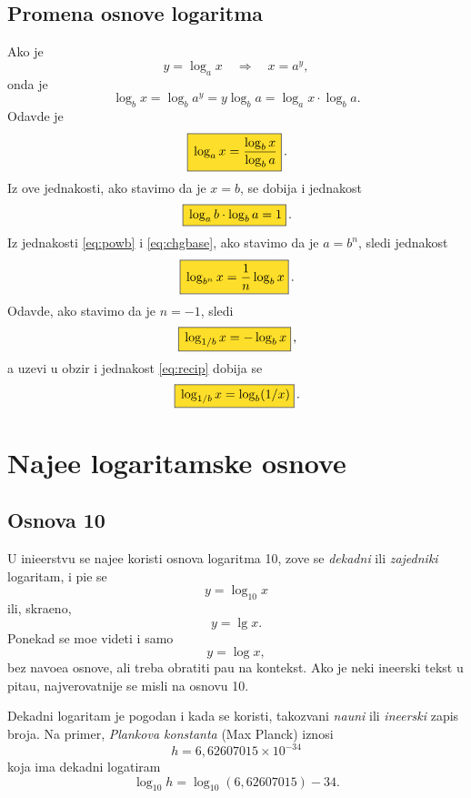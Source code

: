 \documentclass[12pt, twoside, a4paper]{article}
\def\logten{\log_{10}}
\def\loga{\log_a}
\def\logb{\log_b}
\def\puta{\times}
\def\.{{,}}
\def\okvir#1{\,\fcolorbox{black}{Goldenrod}{$\displaystyle{\mathstrut #1}$}\,}
\def\sledi{{\quad\Rightarrow\quad}}
\begin{document}
\subsection{Promena osnove logaritma}

Ako je
$$
y = \loga x\sledi x = a^y,
$$
onda je 
$$
\logb x=\logb a^y=y\logb a=\loga x\cdot\logb a.
$$
Odavde je
\begin{equation}
\okvir{\loga x={\logb x\over\logb a}}.
\label{eq:chgbase}
\end{equation}
Iz ove jednakosti, ako stavimo da je $x=b$, se dobija i jednakost
\begin{equation}
\okvir{\loga b\cdot\logb a = 1}.
\end{equation}
Iz jednakosti \eqref{eq:powb} i \eqref{eq:chgbase}, ako stavimo da je $a=b^n$, sledi jednakost
\begin{equation}
\okvir{\log_{b^n}x = {1\over n}\logb x}.
\label{eq:powbase}
\end{equation}
Odavde, ako stavimo da je $n=-1$, sledi
\begin{equation}
\okvir{\log_{1/b}x = -\logb x},
\end{equation}
a uzev{\sv}i u obzir i jednakost \eqref{eq:recip} dobija se
\begin{equation}
\okvir{\log_{1/b}x = \logb(1/x)}.
\end{equation}



\section{Naj{\cv}e{\sv}{\cc}e logaritamske osnove}

\subsection{Osnova 10}

U ini{\zv}e{\nj}erstvu se naj{\cv}e{\sv}{\cc}e koristi osnova logaritma 10,
zove se {\sl dekadni\/} ili {\sl zajedni{\cv}ki\/} logaritam, i pi{\sv}e se
$$
y=\logten x
$$
ili, skra{\cc}eno,
$$
y=\lg x.
$$
Ponekad se mo{\zv}e videti i samo
$$
y=\log x,
$$
bez navo{\dj}e{\nj}a osnove, ali treba obratiti pa{\zv}{\nj}u na kontekst.
Ako je neki in{\zv}e{\nj}erski tekst u pita{\nj}u, najverovatnije se misli na osnovu 10.

Dekadni logaritam je pogodan i kada se koristi, takozvani {\sl nau{\cv}ni\/} ili {\sl in{\zv}e{\nj}erski\/}
zapis broja.
Na primer, {\sl Plankova konstanta\/} (Max Planck) iznosi
$$
h=6\.62607015\puta 10^{-34}
$$
koja ima dekadni logatiram
$$
\logten h=\logten(6\.62607015) - 34.
$$
\end{document}
